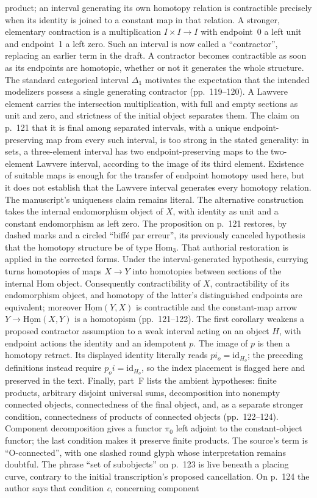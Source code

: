 product; an interval generating its own homotopy relation is contractible precisely when its identity is joined to a constant map in that relation. A stronger, elementary contraction is a multiplication $I\times I\to I$ with endpoint~0 a left unit and endpoint~1 a left zero. Such an interval is now called a ``contractor'', replacing an earlier term in the draft. A contractor becomes contractible as soon as its endpoints are homotopic, whether or not it generates the whole structure. The standard categorical interval $\Delta_1$ motivates the expectation that the intended modelizers possess a single generating contractor (pp.~119--120). A Lawvere element carries the intersection multiplication, with full and empty sections as unit and zero, and strictness of the initial object separates them. The claim on p.~121 that it is final among separated intervals, with a unique endpoint-preserving map from every such interval, is too strong in the stated generality: in sets, a three-element interval has two endpoint-preserving maps to the two-element Lawvere interval, according to the image of its third element. Existence of suitable maps is enough for the transfer of endpoint homotopy used here, but it does not establish that the Lawvere interval generates every homotopy relation. The manuscript's uniqueness claim remains literal. The alternative construction takes the internal endomorphism object of $X$, with identity as unit and a constant endomorphism as left zero. The proposition on p.~121 restores, by dashed marks and a circled ``biffé par erreur'', its previously canceled hypothesis that the homotopy structure be of type $\mathrm{Hom}_3$. That authorial restoration is applied in the corrected forms. Under the interval-generated hypothesis, currying turns homotopies of maps $X\to Y$ into homotopies between sections of the internal Hom object. Consequently contractibility of $X$, contractibility of its endomorphism object, and homotopy of the latter's distinguished endpoints are equivalent; moreover $\underline{\mathrm{Hom}}(Y,X)$ is contractible and the constant-map arrow $Y\to\underline{\mathrm{Hom}}(X,Y)$ is a homotopism (pp.~121--122). The first corollary weakens a proposed contractor assumption to a weak interval acting on an object $H$, with endpoint actions the identity and an idempotent $p$. The image of $p$ is then a homotopy retract. Its displayed identity literally reads $pi_o=\mathrm{id}_{H_o}$; the preceding definitions instead require $p_oi=\mathrm{id}_{H_o}$, so the index placement is flagged here and preserved in the text. Finally, part~F lists the ambient hypotheses: finite products, arbitrary disjoint universal sums, decomposition into nonempty connected objects, connectedness of the final object, and, as a separate stronger condition, connectedness of products of connected objects (pp.~122--124). Component decomposition gives a functor $\pi_0$ left adjoint to the constant-object functor; the last condition makes it preserve finite products. The source's term is ``O-connected'', with one slashed round glyph whose interpretation remains doubtful. The phrase ``set of subobjects'' on p.~123 is live beneath a placing curve, contrary to the initial transcription's proposed cancellation. On p.~124 the author says that condition \emph{c}, concerning component 